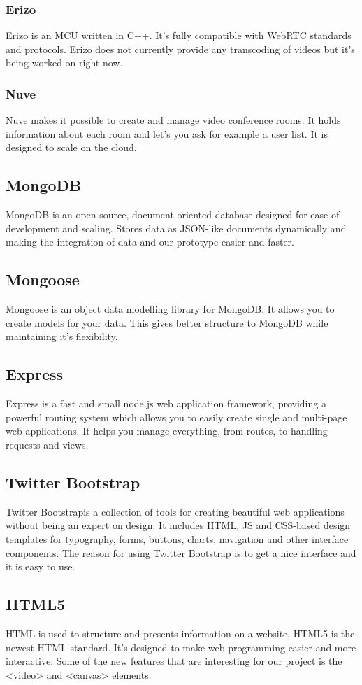 \documentclass[12pt, titlepage]{article}
\begin{document}
\subsubsection{Erizo}
Erizo is an MCU written in C++. It's fully compatible with WebRTC standards and protocols. Erizo does not currently provide any transcoding of videos but it's being worked on right now. 
\subsubsection{Nuve}
Nuve makes it possible to create and manage video conference rooms. It holds information about each room and let's you ask for example a user list. It is designed to scale on the cloud.
\subsection{MongoDB}
MongoDB\cite{29} is an open-source, document-oriented database designed for ease of development and scaling. Stores data as JSON-like documents dynamically and making the integration of data and our prototype easier and faster.
\subsection{Mongoose}
Mongoose\cite{30} is an object data modelling library for MongoDB. It allows you to create models for your data. This gives better structure to MongoDB while maintaining it's flexibility.
\subsection{Express}
Express\cite{31} is a fast and small node.js web application framework, providing a powerful routing system which allows you to easily create single and multi-page web applications. It helps you manage everything, from routes, to handling requests and views.
\subsection{Twitter Bootstrap}
Twitter Bootstrap\cite{32}is a collection of tools for creating beautiful web applications without being an expert on design. It includes HTML, JS and CSS-based design templates for typography, forms, buttons, charts, navigation and other interface components. The reason for using Twitter Bootstrap is to get a nice interface and it is easy to use.
\subsection{HTML5}
HTML is used to structure and presents information on a website, HTML5 is the newest HTML standard. It's designed to make web programming easier and more interactive. Some of the new features that are interesting for our project is the <video> and <canvas> elements.
\end{document}
